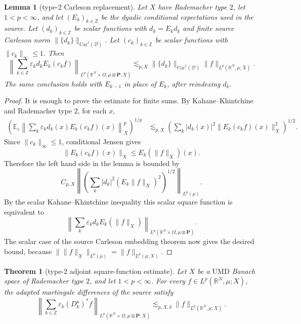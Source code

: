 \documentclass[11pt]{amsart}
\newtheorem{theorem}{Theorem}
\newtheorem{lemma}{Lemma}
\newcommand{\R}{\mathbb R}
\newcommand{\Z}{\mathbb Z}
\newcommand{\E}{\mathbb E}
\newcommand{\UMD}{\mathrm{UMD}}
\newcommand{\Car}{\mathrm{Car}}
\begin{document}
\begin{lemma}[type-2 Carleson replacement]\label{lem:type2-carleson}
Let \(X\) have Rademacher type \(2\), let \(1<p<\infty\), and let
\((E_k)_{k\in\Z}\) be the dyadic conditional expectations used in the source.
Let \((d_k)_{k\in\Z}\) be scalar functions with \(d_k=E_kd_k\) and finite
source Carleson norm \(\|\{d_k\}\|_{\Car^1(\mathcal D)}\).  Let
\((c_k)_{k\in\Z}\) be scalar functions with \(\|c_k\|_\infty\le1\).  Then
\[
  \left\|\sum_{k\in\Z}\varepsilon_k d_kE_k(c_kf)\right\|_
  {L^p(\R^N\times\Omega,\mu\otimes\mathbf P;X)}
  \lesssim_{p,X}
  \|\{d_k\}\|_{\Car^1(\mathcal D)}
  \|f\|_{L^p(\R^N,\mu;X)} .
\]
The same conclusion holds with \(E_{k-1}\) in place of \(E_k\), after
reindexing \(d_k\).
\end{lemma}

\begin{proof}
It is enough to prove the estimate for finite sums.  By Kahane--Khintchine
and Rademacher type \(2\), for each \(x\),
\[
\begin{aligned}
  \left(\E_\varepsilon
  \left\|\sum_k\varepsilon_k d_k(x)E_k(c_kf)(x)\right\|_X^p
  \right)^{1/p}
  &\lesssim_{p,X}
  \left(\sum_k |d_k(x)|^2\|E_k(c_kf)(x)\|_X^2\right)^{1/2}.
\end{aligned}
\]
Since \(\|c_k\|_\infty\le1\), conditional Jensen gives
\[
  \|E_k(c_kf)(x)\|_X\le E_k(\|f\|_X)(x).
\]
Therefore the left hand side in the lemma is bounded by
\[
  C_{p,X}
  \left\|
  \left(\sum_k |d_k|^2(E_k\|f\|_X)^2\right)^{1/2}
  \right\|_{L^p(\mu)} .
\]
By the scalar Kahane--Khintchine inequality this scalar square function is
equivalent to
\[
  \left\|\sum_k\varepsilon_k d_kE_k(\|f\|_X)\right\|_
  {L^p(\R^N\times\Omega,\mu\otimes\mathbf P)} .
\]
The scalar case of the source Carleson embedding theorem now gives the
desired bound, because
\(\|\|f\|_X\|_{L^p(\mu)}=\|f\|_{L^p(\mu;X)}\).
\end{proof}

\begin{theorem}[type-2 adjoint square-function estimate]\label{thm:main}
Let \(X\) be a \(\UMD\) Banach space of Rademacher type \(2\), and let
\(1<p<\infty\).  For every \(f\in L^p(\R^N,\mu;X)\), the adapted martingale
differences of the source satisfy
\[
  \left\|\sum_{k\in\Z}\varepsilon_k(D_k^a)^*f\right\|_
  {L^p(\R^N\times\Omega,\mu\otimes\mathbf P;X)}
  \lesssim_{p,X,\delta}
  \|f\|_{L^p(\R^N,\mu;X)} .
\]
\end{theorem}
\end{document}
